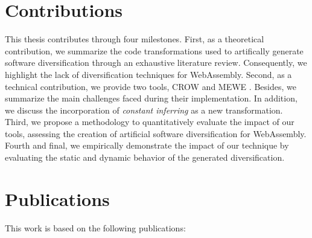 \section{Contributions}

This thesis contributes through four milestones. First, as a theoretical contribution, we summarize the code transformations used to artifically generate software diversification through an exhaustive literature review. Consequently, we highlight the lack of diversification techniques for WebAssembly.  Second, as a technical contribution, we provide two tools, CROW \cite{CROW} and MEWE \cite{MEWE}. Besides, we summarize the main challenges faced during their implementation. In addition, we discuss the incorporation of \emph{constant inferring} as a new transformation. Third, we propose a methodology to quantitatively evaluate the impact of our tools, assessing the creation of artificial software diversification for WebAssembly. Fourth and final, we empirically demonstrate the impact of our technique by evaluating the static and dynamic behavior of the generated diversification.

\pagebreak
\section{Publications}

This work is based on the following publications:

